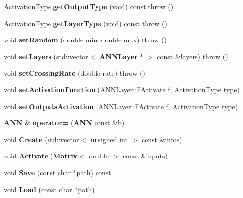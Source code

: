 \begin{DoxyCompactItemize}
\item 
Activation\+Type {\bfseries get\+Output\+Type} (void) const   throw ()\label{class_g_a_n_n_1_1_a_n_n_a5b018a16c817ea663979847b51759299}

\item 
Activation\+Type {\bfseries get\+Layer\+Type} (void) const   throw ()\label{class_g_a_n_n_1_1_a_n_n_abe0b24faf6c8664c66157c6de3a92774}

\item 
void {\bfseries set\+Random} (double min, double max)  throw ()\label{class_g_a_n_n_1_1_a_n_n_adcedd9edf79df8a07a25d11cdefb5310}

\item 
void {\bfseries set\+Layers} (std\+::vector$<$ {\bf A\+N\+N\+Layer} $\ast$ $>$ const \&layers)  throw ()\label{class_g_a_n_n_1_1_a_n_n_aae6cc0117e368dec728e5164fd4877cc}

\item 
void {\bfseries set\+Crossing\+Rate} (double rate)  throw ()\label{class_g_a_n_n_1_1_a_n_n_a4476dd0e4d95747cae5489db42639190}

\item 
void {\bfseries set\+Activation\+Function} (A\+N\+N\+Layer\+::\+F\+Activate f, Activation\+Type type)\label{class_g_a_n_n_1_1_a_n_n_a416cb5c5b0d916a9f2ed005494f07be6}

\item 
void {\bfseries set\+Outputs\+Activation} (A\+N\+N\+Layer\+::\+F\+Activate f, Activation\+Type type)\label{class_g_a_n_n_1_1_a_n_n_acc21816e2cb7543eb64d01d9f4a2e30a}

\item 
{\bf A\+N\+N} \& {\bfseries operator=} ({\bf A\+N\+N} const \&b)\label{class_g_a_n_n_1_1_a_n_n_a854dad61d6d8099bf1b9a8d3930a73ab}

\item 
void {\bfseries Create} (std\+::vector$<$ unsigned int $>$ const \&infos)\label{class_g_a_n_n_1_1_a_n_n_a65b8b6fd67dc3a07a40a39cc611af319}

\item 
void {\bfseries Activate} ({\bf Matrix}$<$ double $>$ const \&inputs)\label{class_g_a_n_n_1_1_a_n_n_a6e5ff8d7eaf90d7f38547763efcb4ab7}

\item 
void {\bfseries Save} (const char $\ast$path) const \label{class_g_a_n_n_1_1_a_n_n_a523bdbe95d22035e8019868f619aa50e}

\item 
void {\bfseries Load} (const char $\ast$path)\label{class_g_a_n_n_1_1_a_n_n_a6509ae3de47262d62a68056c24d06b92}


\end{DoxyCompactItemize}

